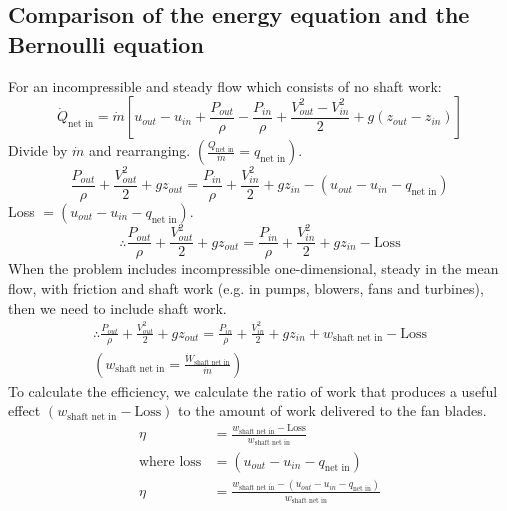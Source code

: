 \subsection{Comparison of the energy equation and the \\ Bernoulli equation}
For an incompressible and steady flow which consists of no shaft work:
\begin{equation}
  \dot{Q}_{\textrm{net in}} = \dot{m} \left[ u_{out} - u_{in} + \frac{P_{out}}{\rho} - \frac{P_{in}}{\rho} + \frac{V_{out}^2 - V_{in}^2}{2} + g(z_{out} - z_{in}) \right]
\end{equation}
Divide by $\dot{m}$ and rearranging. $(\frac{Q_{\textrm{net in}}}{\dot{m}} = q_{\textrm{net in}})$.
\begin{equation}
  \frac{P_{out}}{\rho} + \frac{V_{out}^2}{2} + gz_{out} = \frac{P_{in}}{\rho} + \frac{V_{in}^2}{2} + gz_{in} - (u_{out} - u_{in} - q_{\textrm{net in}})
\end{equation}
Loss $= (u_{out} - u_{in} - q_{\textrm{net in}})$.
\begin{equation}
  \therefore \frac{P_{out}}{\rho} + \frac{V_{out}^2}{2} + gz_{out} = \frac{P_{in}}{\rho} + \frac{V_{in}^2}{2} + gz_{in} - \textrm{Loss}
\end{equation}
When the problem includes incompressible one-dimensional, steady in the mean flow, with friction and shaft work (e.g. in pumps, blowers, fans and turbines), then we need to include shaft work.
\begin{gather}
  \therefore \frac{P_{out}}{\rho} + \frac{V_{out}^2}{2} + gz_{out} = \frac{P_{in}}{\rho} + \frac{V_{in}^2}{2} + gz_{in} + w_{\textrm{shaft net in}} - \textrm{Loss}\\
  (w_{\textrm{shaft net in}} = \frac{\dot{W}_{\textrm{shaft net in}}}{\dot{m}})
\end{gather}
To calculate the efficiency, we calculate the ratio of work that produces a useful effect $(w_{\textrm{shaft net in}} - \textrm{Loss})$ to the amount of work delivered to the fan blades.
\begin{align}
  \eta                & = \frac{w_{\textrm{shaft net in}} - \textrm{Loss}}{w_{\textrm{shaft net in}}}                            \\
  \textrm{where loss} & = (u_{out} - u_{in} - q_{\textrm{net in}})                                                               \\
  \eta                & = \frac{w_{\textrm{shaft net in}} - (u_{out} - u_{in} - q_{\textrm{net in}})}{w_{\textrm{shaft net in}}}
\end{align}